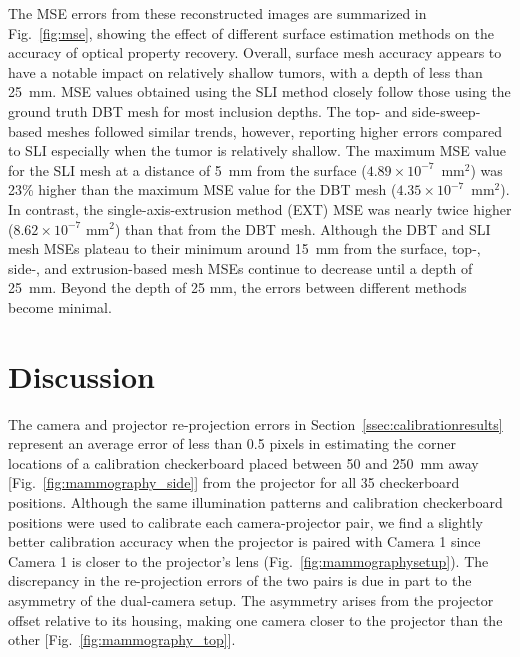 The MSE errors from these reconstructed images are summarized in Fig.~\ref{fig:mse}, showing the effect of different surface estimation methods on the accuracy of optical property recovery. Overall, surface mesh accuracy appears to have a notable impact on relatively shallow tumors, with a depth of less than 25~mm. MSE values obtained using the SLI method closely follow those using the ground truth DBT mesh for most inclusion depths. The top- and side-sweep-based meshes followed similar trends, however, reporting higher errors compared to SLI especially when the tumor is relatively shallow. The maximum MSE value for the SLI mesh at a distance of 5~mm from the surface ($4.89\times 10^{-7}$~mm$^2$) was 23\% higher than the maximum MSE value for the DBT mesh ($4.35\times 10^{-7}$~mm$^2$). In contrast, the single-axis-extrusion method (EXT) MSE was nearly twice higher ($8.62\times 10^{-7}$ mm$^2$) than that from the DBT mesh. Although the DBT and SLI mesh MSEs plateau to their minimum around 15~mm from the surface, top-, side-, and extrusion-based mesh MSEs continue to decrease until a depth of 25~mm. Beyond the depth of 25 mm, the errors between different methods become minimal.



\section{Discussion}
\label{chap:omci:discussion}
The camera and projector re-projection errors in Section~\ref{ssec:calibrationresults} represent an average error of less than 0.5 pixels in estimating the corner locations of a calibration checkerboard placed between 50 and 250~mm away [Fig.~\ref{fig:mammography_side}] from the projector for all 35 checkerboard positions. Although the same illumination patterns and calibration checkerboard positions were used to calibrate each camera-projector pair, we find a slightly better calibration accuracy when the projector is paired with Camera 1 since Camera 1 is closer to the projector's lens (Fig.~\ref{fig:mammographysetup}). The discrepancy in the re-projection errors of the two pairs is due in part to the asymmetry of the dual-camera setup. The asymmetry arises from the projector offset relative to its housing, making one camera closer to the projector than the other [Fig.~\ref{fig:mammography_top}]. 

